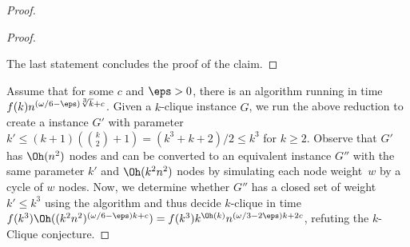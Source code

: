 \begin{proof}
\begin{proof}
\begin{enumerate}[label=\arabic*)]
\end{enumerate}
The last statement concludes the proof of the claim.
\cqed
\end{proof}
%
Assume that for some $c$ and $\eps >0$, there is an \Implication algorithm running in time $f(k)n^{(\omega/6-\eps)\sqrt[3]{k}+c}$. Given a $k$-clique instance $G$, we run the above reduction to create a \wDAGImplication instance $G'$ with parameter $k'\le (k+1)({k \choose 2} + 1) = (k^3 + k+2)/2 \le k^3$ for $k\ge 2$. Observe that $G'$ has $\Oh(n^2)$ nodes and can be converted to an equivalent \Implication instance $G''$ with the same parameter $k'$ and $\Oh(k^2n^2)$ nodes by simulating each node weight~$w$ by a cycle of $w$ nodes. Now, we determine whether  $G''$ has a closed set of weight $k' \le k^3$ using the \Implication algorithm and thus decide $k$-clique in time $f(k^3)\Oh((k^2n^2)^{(\omega/6-\eps) k + c})=f(k^3)k^{\Oh(k)}n^{(\omega/3-2\eps) k + 2c}$, refuting the $k$-Clique conjecture.
\end{proof}
%
%
